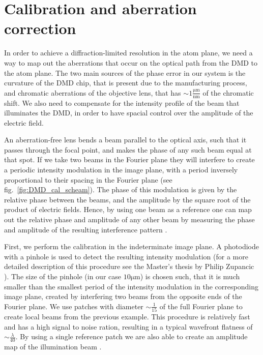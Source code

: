 \section{Calibration and aberration correction}
In order to achieve a diffraction-limited resolution in the atom plane, we need a way to map out the aberrations that occur on the optical path from the DMD to the atom plane. The two main sources of the phase error in our system is the curvature of the DMD chip, that is present due to the manufacturing process, and chromatic aberrations of the objective lens, that has $\sim 1 \frac{\mathrm{\mu m}}{\mathrm{nm}} $ of the chromatic shift. We also need to compensate for the intensity profile of the beam that illuminates the DMD, in order to have spacial control over the amplitude of the electric field.

An aberration-free lens bends a beam parallel to the optical axis, such that it passes through the focal point, and makes the phase of any such beam equal at that spot. If we take two beams in the Fourier plane they will interfere to create a periodic intensity modulation in the image plane, with a period inversely proportional to their spacing in the Fourier plane (see fig.~\ref{fig:DMD_cal_scheam}). The phase of this modulation is given by the relative phase between the beams, and the amplitude by the square root of the product of electric fields. Hence, by using one beam as a reference one can map out the relative phase and amplitude of any other beam by measuring the phase and amplitude of the resulting interference pattern \cite{Zupancic2016}.

First, we perform the calibration in the indeterminate image plane. A photodiode with a pinhole is used to detect the resulting intensity modulation (for a more detailed description of this procedure see the Master’s thesis by Philip Zupancic \cite{Zupancic thesis}). The size of the pinhole (in our case $10 \mathrm{\mu m}$) is chosen such, that it is much smaller than the smallest period of the intensity modulation in the corresponding image plane, created by interfering two beams from the opposite ends of the Fourier plane. We use patches with diameter $\sim \frac{1}{15}$ of the full Fourier plane to create local beams from the previous example. This procedure is relatively fast and has a high signal to noise ration, resulting in a typical wavefront flatness of $\sim \frac{\lambda}{40}$. By using a single reference patch we are also able to create an amplitude map of the illumination beam \cite{Zupancic2016}.  

